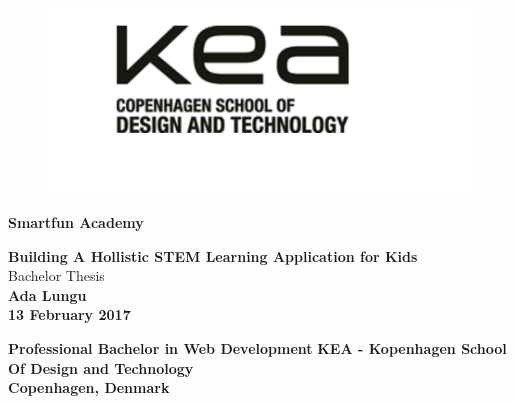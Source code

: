 \documentclass{report}
\begin{document}
\begin{titlepage}
        \begin{figure}
		\includegraphics[width=0.5\linewidth]{images/kea.png}
		\end{figure}
    \begin{center}
        \vspace*{1cm}
        
        \Huge
        \textbf{Smartfun Academy}
        \vspace{0.5cm}

        \LARGE
        \textbf{Building A Hollistic STEM Learning Application for Kids}\\
        \vspace{1.5cm}
        Bachelor Thesis\\
        \vspace{1.5cm}
        \textbf{Ada Lungu}\\
        \vspace{0.5cm}
        \Large
        \textbf{13 February 2017}\\
        \vspace{2.5cm}
        
        \Large
        \textbf{Professional Bachelor in Web Development}
        \textbf{ KEA - Kopenhagen School Of Design and Technology}\\
        \textbf{Copenhagen, Denmark}
        
        
    \end{center}
\end{titlepage}



\newcommand{\sfun}{\textbf{SmartFun} }




% 


% 
\end{document}

